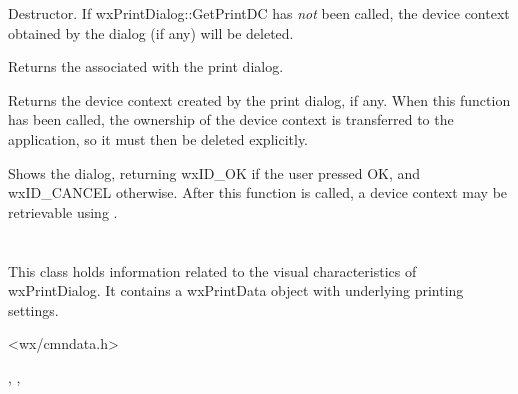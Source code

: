 
Destructor. If wxPrintDialog::GetPrintDC has {\it not} been called,
the device context obtained by the dialog (if any) will be deleted.


\label{wxprintdialoggetprintdialogdata}


Returns the  associated with the print dialog.


\label{wxprintdialoggetprintdc}


Returns the device context created by the print dialog, if any.
When this function has been called, the ownership of the device context
is transferred to the application, so it must then be deleted
explicitly.


\label{wxprintdialogshowmodal}


Shows the dialog, returning wxID\_OK if the user pressed OK, and wxID\_CANCEL
otherwise. After this function is called, a device context may
be retrievable using .

\section{}\label{wxprintdialogdata}

This class holds information related to the visual characteristics of wxPrintDialog.
It contains a wxPrintData object with underlying printing settings.




<wx/cmndata.h>


, 
, 



\label{wxprintdialogdatactor}

